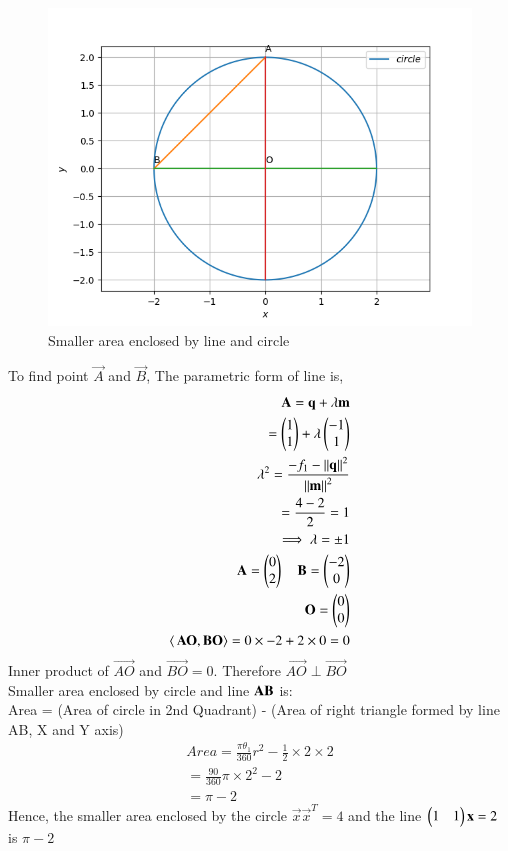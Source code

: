 \documentclass[journal,12pt,twocolumn]{IEEEtran}
\begin{document}
\begin{figure}[h!]
	\centering
	\includegraphics[width=\columnwidth]{circle.png}
	\caption{Smaller area enclosed by line and circle}
	\label{eq:myfig}
\end{figure}

To find point $\vec{A}$ and $\vec{B}$,
The parametric form of line is,
\begin{align}
    \mathbf{A} = \mathbf{q}+\lambda\mathbf{m}\label{eq9}\\
            = \begin{pmatrix}1\\1\end{pmatrix}+\lambda\begin{pmatrix}-1\\1\end{pmatrix}\label{eq10}\\
    \lambda^2 = \frac{-f_1-\left\lVert\mathbf{q}\right\rVert^2}{\left\lVert\mathbf{m}\right\rVert^2}\label{eq11}\\
                = \frac{4-2}{2} = 1\label{eq12}\\
    \implies \lambda = \pm{1} \label{eq13}\\
    \mathbf{A} = \begin{pmatrix}0\\2\end{pmatrix}\quad \mathbf{B} = \begin{pmatrix}-2\\0\end{pmatrix}\label{eq14}\\
 \mathbf{O} = \begin{pmatrix}0\\0\end{pmatrix} \\
 \langle\,\mathbf {AO},\mathbf{BO}\rangle=0\times-2+2\times0=0
\end{align}
Inner product of $\vec{AO}$ and $\vec{BO}=0$. Therefore $\vec{AO} \perp \vec{BO}$ \\
Smaller area enclosed by circle and line $\bf{AB}$ is:\\
 Area = (Area of circle in 2nd Quadrant) - (Area of right triangle formed by line AB, X and Y axis)
 \begin{align}
Area=\frac{\pi\theta_1}{360}r^2-\frac{1}{2}\times2\times2\label{eq15}\\
=\frac{90}{360}\pi\times2^2-2\label{eq16}\\
=\pi-2\label{eq17}
\end{align}
Hence, the smaller area enclosed by the circle  $\vec{x}\vec{x}^T=4$ and the line $\begin{pmatrix}1 & 1\end{pmatrix} \mathbf{x}=2$ is $\pi-2$
\end{document}

